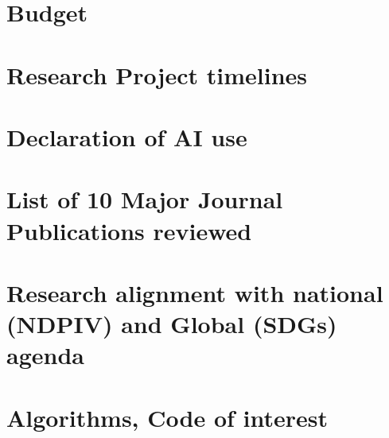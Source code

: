 
\chapter{Budget  }
\label{App:budget}



\chapter{Research Project timelines }
\label{App:research-project-timelines}



\chapter{Declaration of AI use }
\label{App:AI-use-declaration}




\chapter{List of 10 Major Journal Publications reviewed  }
\label{App:major-journal-publications-reviewed}




% 


\chapter{Research alignment with national (NDPIV) and Global (SDGs) agenda }
\label{App:research-allignment-with-national-and-global-agenda}





\chapter{Algorithms, Code of interest}
\label{App:algorithms-and-code}



